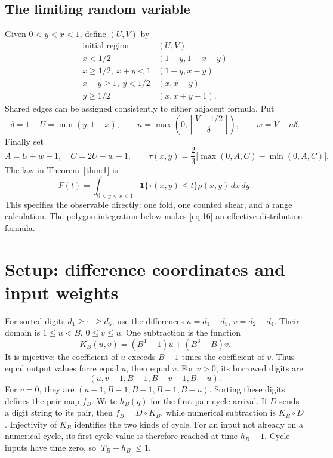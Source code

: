 \documentclass[11pt]{amsart}
\begin{document}
\subsection{The limiting random variable}\label{sec:limitvar}

Given \(0<y<x<1\), define \((U,V)\) by \begin{equation}\label{eq:13}
\begin{array}{c|c}
\text{initial region}&(U,V)\\\hline
x<1/2 &(1-y,1-x-y)\\
x\ge1/2,\ x+y<1 &(1-y,x-y)\\
x+y\ge1,\ y<1/2 &(x,x-y)\\
y\ge1/2 &(x,x+y-1).
\end{array}
\end{equation} Shared edges can be assigned consistently to either adjacent formula. Put \begin{equation}\label{eq:14}
\delta=1-U=\min(y,1-x),\qquad
 n=\max\left(0,\left\lceil\frac{V-1/2}{\delta}\right\rceil\right),
 \qquad w=V-n\delta.
\end{equation} Finally set \begin{equation}\label{eq:15}
A=U+w-1,\quad C=2U-w-1,\qquad
 \tau(x,y)=\frac23\bigl[\max(0,A,C)-\min(0,A,C)\bigr].
\end{equation} The law in Theorem~\ref{thm:1} is \begin{equation}\label{eq:16}
F(t)=\int_{0<y<x<1}\mathbf1\{\tau(x,y)\le t\}\rho(x,y)\,dx\,dy.
\end{equation} This specifies the observable directly: one fold, one counted shear, and a range calculation. The polygon integration below makes \eqref{eq:16} an effective distribution formula.

\section{Setup: difference coordinates and input weights}

For sorted digits \(d_1\ge\cdots\ge d_5\), use the differences \(u=d_1-d_5\), \(v=d_2-d_4\). Their domain is \(1\le u<B\), \(0\le v\le u\). One subtraction is the function \[K_B(u,v)=(B^4-1)u+(B^3-B)v.\] It is injective: the coefficient of \(u\) exceeds \(B-1\) times the coefficient of \(v\). Thus equal output values force equal \(u\), then equal \(v\). For \(v>0\), its borrowed digits are \begin{equation}\label{eq:17}
(u,v-1,B-1,B-v-1,B-u).
\end{equation} For \(v=0\), they are \((u-1,B-1,B-1,B-1,B-u)\). Sorting these digits defines the pair map \(f_B\). Write \(h_B(q)\) for the first pair-cycle arrival. If \(D\) sends a digit string to its pair, then \(f_B=D\circ K_B\), while numerical subtraction is \(K_B\circ D\). Injectivity of \(K_B\) identifies the two kinds of cycle. For an input not already on a numerical cycle, its first cycle value is therefore reached at time \(h_B+1\). Cycle inputs have time zero, so \(|T_B-h_B|\le1\).
\end{document}
